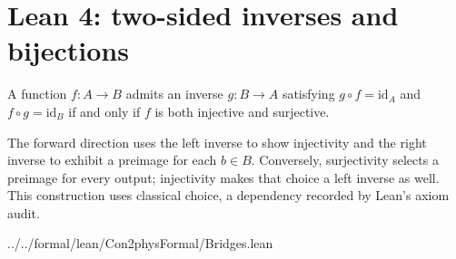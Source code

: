\section{Lean 4: two-sided inverses and bijections}
\label{sec:lean-bridge-07}
A function $f:A\to B$ admits an inverse $g:B\to A$ satisfying
$g\circ f=\mathrm{id}_A$ and $f\circ g=\mathrm{id}_B$
if and only if $f$ is both injective and surjective.

The forward direction uses the left inverse to show injectivity
and the right inverse to exhibit a preimage for each $b\in B$.
Conversely, surjectivity selects a preimage for every output;
injectivity makes that choice a left inverse as well.
This construction uses classical choice, a dependency recorded
by Lean's axiom audit.


{../../formal/lean/Con2physFormal/Bridges.lean}
